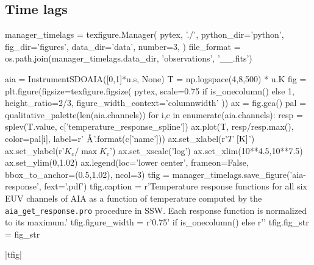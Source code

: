 \subsection{Time lags}\label{sec:timelags}

\begin{pycode}
manager_timelags = texfigure.Manager(
    pytex, './',
    python_dir='python',
    fig_dir='figures',
    data_dir='data',
    number=3,
)
file_format = os.path.join(manager_timelags.data_dir, 'observations', '{}_{}_{}.fits')
\end{pycode}

\begin{pycode}
aia = InstrumentSDOAIA([0,1]*u.s, None)
T = np.logspace(4,8,500) * u.K
fig = plt.figure(figsize=texfigure.figsize(
    pytex,
    scale=0.75 if is_onecolumn() else 1,
    height_ratio=2/3,
    figure_width_context='columnwidth'
))
ax = fig.gca()
pal = qualitative_palette(len(aia.channels))
for i,c in enumerate(aia.channels):
    resp = splev(T.value, c['temperature_response_spline'])
    ax.plot(T, resp/resp.max(), color=pal[i], label=r'{} $\textup{{\AA}}$'.format(c['name']))
ax.set_xlabel(r'$T\,\,[\textup{K}]$')
ax.set_ylabel(r'$K_c/\max{K_c}$')
ax.set_xscale('log')
ax.set_xlim(10**4.5,10**7.5)
ax.set_ylim(0,1.02)
ax.legend(loc='lower center', frameon=False, bbox_to_anchor=(0.5,1.02), ncol=3)
tfig = manager_timelags.save_figure('aia-response', fext='.pdf')
tfig.caption = r'Temperature response functions for all six EUV channels of AIA as a function of temperature computed by the \texttt{aia\_get\_response.pro} procedure in SSW. Each response function is normalized to its maximum.'
tfig.figure_width = r'0.75\columnwidth' if is_onecolumn() else r'\columnwidth'
tfig.fig_str = fig_str
\end{pycode}
|tfig|

